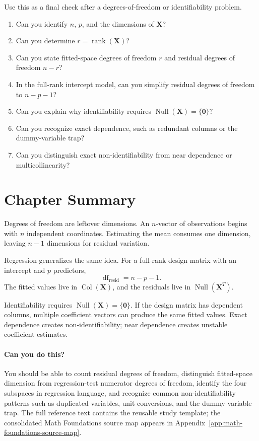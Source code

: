 {Use this as a final check after a degrees-of-freedom or identifiability problem.

\begin{enumerate}
  \item Can you identify \(n\), \(p\), and the dimensions of \(\mathbf{X}\)?
  \item Can you determine \(r=\operatorname{rank}(\mathbf{X})\)?
  \item Can you state fitted-space degrees of freedom \(r\) and residual degrees of freedom \(n-r\)?
  \item In the full-rank intercept model, can you simplify residual degrees of freedom to \(n-p-1\)?
  \item Can you explain why identifiability requires \(\operatorname{Null}(\mathbf{X})=\{\mathbf{0}\}\)?
  \item Can you recognize exact dependence, such as redundant columns or the dummy-variable trap?
  \item Can you distinguish exact non-identifiability from near dependence or multicollinearity?
\end{enumerate}
}{
\section{Chapter Summary}

Degrees of freedom are leftover dimensions.  An \(n\)-vector of observations begins with \(n\) independent coordinates.  Estimating the mean consumes one dimension, leaving \(n-1\) dimensions for residual variation.

Regression generalizes the same idea.  For a full-rank design matrix with an intercept and \(p\) predictors,
\begin{equation}
  \operatorname{df}_{\text{resid}}=n-p-1.
\end{equation}
The fitted values live in \(\operatorname{Col}(\mathbf{X})\), and the residuals live in \(\operatorname{Null}(\mathbf{X}^T)\).

Identifiability requires \(\operatorname{Null}(\mathbf{X})=\{\mathbf{0}\}\).  If the design matrix has dependent columns, multiple coefficient vectors can produce the same fitted values.  Exact dependence creates non-identifiability; near dependence creates unstable coefficient estimates.

\paragraph{Can you do this?}
You should be able to count residual degrees of freedom, distinguish fitted-space dimension from regression-test numerator degrees of freedom, identify the four subspaces in regression language, and recognize common non-identifiability patterns such as duplicated variables, unit conversions, and the dummy-variable trap.  The full reference text contains the reusable study template; the consolidated Math Foundations source map appears in Appendix~\ref{app:math-foundations-source-map}.
}
